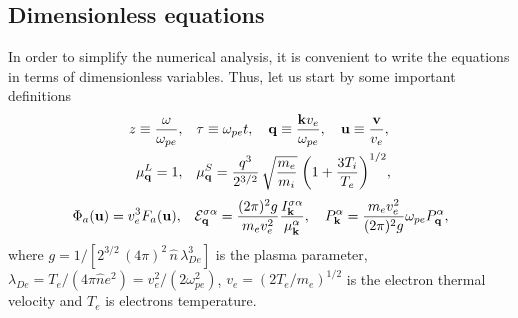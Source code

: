 \documentclass[12pt,a4paper,ruledheader]{report}
\def\calE{{\cal E}}
\begin{document}
\subsection{Dimensionless equations}
In order to simplify the numerical analysis, it is convenient to write
the equations in terms of dimensionless variables. Thus, let us start
by some important definitions
\begin{align*}
  z\equiv \frac{\omega}{\omega_{pe}},
  & \quad \tau\equiv \omega_{pe}t, \quad
    {\bf q}\equiv \frac{{\bf k}v_e}{\omega_{pe}}, \quad
    {\bf u}\equiv \frac{\bf v}{v_e},\\
  \mu_{\bf q}^L
  = 1,&\quad\mu_{\bf q}^S = \frac{q^3}{2^{3/2}}
	\,\sqrt{\frac{m_e}{m_i}}\;\biggl(1+\frac{3T_i}{T_e}\biggr)^{1/2},
\end{align*}
\begin{align*}
  \Phi_a({\bf u})=  v_e^3 F_a({\bf u}),& \quad
    \calE_{\bf q}^{\sigma\alpha}= \frac{(2\pi)^2 g}{m_ev_e^2}
    \frac{I_{\bf k}^{\sigma\alpha}}{\mu_{\bf k}^\alpha},\quad
    P_{\bf k}^\alpha=\frac{m_ev_e^2}{(2\pi)^2g}\omega_{pe}P_{\bf q}^\alpha,\\
\end{align*}
where $g=1/[2^{3/2}\,(4\pi)^2\,\hat{n}\,\lambda_{De}^3]$ is the
plasma parameter, $\lambda_{De}=T_e/(4\pi\hat{n}e^2)=v_e^2/(2\omega_{pe}^2)$,
$v_e=(2T_e/m_e)^{1/2}$ is the electron thermal velocity and $T_e$ is
electrons temperature.
\end{document}
